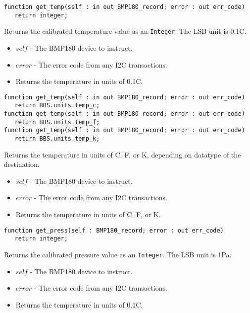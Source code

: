 \documentclass[10pt, openany]{book}
\newcommand{\datatype}[1]{\texttt{#1}}
\begin{document}
\begin{lstlisting}
function get_temp(self : in out BMP180_record; error : out err_code)
   return integer;
\end{lstlisting}
Returns the calibrated temperature value as an \datatype{Integer}.  The LSB unit is 0.1\degree{}C.
\begin{itemize}
  \item $self$ - The BMP180 device to instruct.
  \item $error$ - The error code from any I2C transactions.
  \item Returns the temperature in units of 0.1\degree{}C.
\end{itemize}

\begin{lstlisting}
function get_temp(self : in out BMP180_record; error : out err_code)
   return BBS.units.temp_c;
function get_temp(self : in out BMP180_record; error : out err_code)
   return BBS.units.temp_f;
function get_temp(self : in out BMP180_record; error : out err_code)
   return BBS.units.temp_k;
\end{lstlisting}
Returns the temperature in units of \degree{}C, \degree{}F, or K, depending on datatype of the destination.
\begin{itemize}
  \item $self$ - The BMP180 device to instruct.  \item $error$ - The error code from any I2C transactions.

  \item Returns the temperature in units of \degree{}C, \degree{}F, or K.
\end{itemize}

\begin{lstlisting}
function get_press(self : BMP180_record; error : out err_code)
   return integer;
\end{lstlisting}
Returns the calibrated pressure value as an \datatype{Integer}.  The LSB unit is 1Pa.
\begin{itemize}
  \item $self$ - The BMP180 device to instruct.
  \item $error$ - The error code from any I2C transactions.
  \item Returns the temperature in units of 0.1\degree{}C.
\end{itemize}
\end{document}
